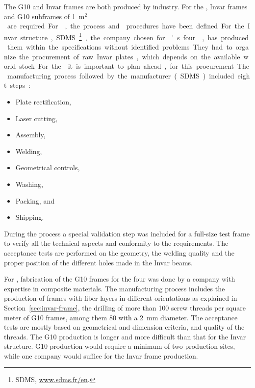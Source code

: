 The G10 and Invar frames are both produced by industry. For the , %
\dptotcrp Invar frames and \dpnumpmtch %
G10 subframes of \SI{1}{m$^2$} are required. %
For , the process and  procedures have been defined.
For the Invar structure, SDMS~\footnote{SDMS\texttrademark{}, \url{www.sdms.fr/en}.}, the company chosen for 's four ,  %
has produced them within the specifications without identified problems.
They had to organize the procurement of raw Invar plates, which depends on the available world stock. For the  it is important to plan ahead, %
 for this procurement. 
The manufacturing process followed by the manufacturer (SDMS) included eight steps:\\
\begin{itemize}
\item Plate rectification,
\item  Laser cutting,
\item  Assembly,
\item  Welding,
\item  Geometrical controls,
\item  Washing,
\item  Packing, and
\item  Shipping.
\end{itemize}

During the process a special validation step was included  for a full-size test frame to verify all the technical aspects and conformity to the requirements. 
The acceptance tests are performed on the geometry, the welding quality and the proper position of the different holes made in the Invar beams.

For , fabrication of the G10 frames for the four  was done by a company with expertise in composite materials. The manufacturing process includes the %
production of frames with fiber layers in different orientations as explained in Section~\ref{sec:invar-frame}, the drilling of more than \num{100} screw threads per square meter of G10 frames, among them \num{80} with a \SI{2}{mm} diameter.
The acceptance tests are mostly based on geometrical and dimension criteria, and quality of the threads.  
The G10 production is longer and more difficult than that for the Invar structure. G10 production would require a minimum of two production sites, while one company would suffice for the Invar frame production.


